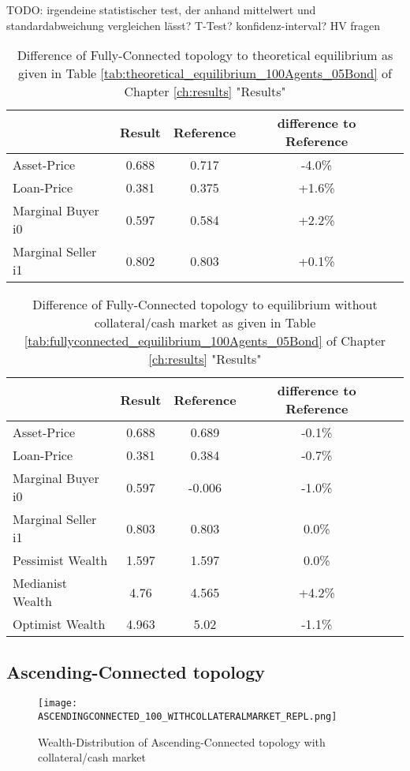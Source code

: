 \documentclass[Bachelorarbeit.tex]{subfiles}
\begin{document}
TODO: irgendeine statistischer test, der anhand mittelwert und standardabweichung vergleichen lässt?
T-Test? konfidenz-interval?
HV fragen

\begin{table}[H]
	\caption{Difference of Fully-Connected topology to theoretical equilibrium as given in Table \ref{tab:theoretical_equilibrium_100Agents_05Bond} of Chapter \ref{ch:results} "Results"}
	\centering
	\begin{tabular} { l c c c r }
		& Result & Reference & difference to Reference \\
		\hline
		Asset-Price & 0.688 & 0.717 & -4.0\% \\
		Loan-Price & 0.381 & 0.375 & +1.6\% \\
		Marginal Buyer i0 & 0.597 & 0.584 & +2.2\% \\
		Marginal Seller i1 & 0.802 & 0.803 & +0.1\% \\
		\hline
	\end{tabular}
\end{table} 

\begin{table}[H]
	\caption{Difference of Fully-Connected topology to equilibrium without collateral/cash market as given in Table \ref{tab:fullyconnected_equilibrium_100Agents_05Bond} of Chapter \ref{ch:results} "Results"}
	\centering
	\begin{tabular} { l c c c r }
		& Result & Reference & difference to Reference \\
		\hline
		Asset-Price & 0.688 & 0.689 & -0.1\% \\
		Loan-Price & 0.381 & 0.384 & -0.7\% \\
		Marginal Buyer i0 & 0.597 & -0.006 & -1.0\% \\
		Marginal Seller i1 & 0.803 & 0.803 & 0.0\% \\
		\hline
		Pessimist Wealth & 1.597 & 1.597 & 0.0\% \\
		Medianist Wealth & 4.76 & 4.565 & +4.2\% \\
		Optimist Wealth & 4.963 & 5.02 & -1.1\% \\
		\hline
	\end{tabular}
\end{table} 

\subsection{Ascending-Connected topology}
\begin{figure}[H]
	\centering
  \texttt{[image: ASCENDINGCONNECTED\_100\_WITHCOLLATERALMARKET\_REPL.png]}
	\caption{Wealth-Distribution of Ascending-Connected topology with collateral/cash market}
	\label{fig:wealth_ASCENDINGCONNECTED_100_WITHCOLLATERALMARKET_REPL}
\end{figure}
\end{document}
